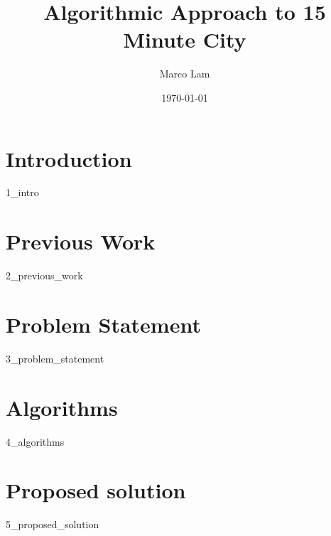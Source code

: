 \documentclass{article}
\title{Algorithmic Approach to 15 Minute City}
\author{Marco Lam}
\date{\today}
\begin{document}
\maketitle

\newpage

\tableofcontents

\newpage

\section{Introduction}

{1_intro}

\section{Previous Work}

{2_previous_work}

\section{Problem Statement}

{3_problem_statement}

\section{Algorithms}

{4_algorithms}

\section{Proposed solution}

{5_proposed_solution}


\end{document}
